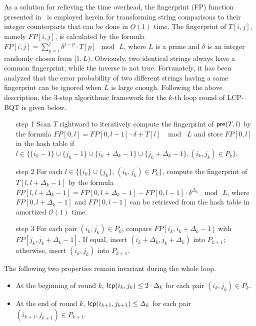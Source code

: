 \documentclass[10pt,journal,compsoc]{IEEEtran}
\begin{document}
\begin{CJK*}{GBK}{song}
As a solution for relieving the time overhead, the fingerprint (FP) function presented in~\cite{Karp1987} is employed herein for transforming string comparisons to their integer counterparts that can be done in $O(1)$ time. The fingerprint of $T[i,j]$, namely $FP[i,j]$, is calculated by the formula $FP[i,j] = \sum_{p=i}^{j} \delta^{j-p} \cdot T[p] \mod \, L$, where $L$ is a prime and $\delta$ is an integer randomly chosen from $[1,L)$. Obviously, two identical strings always have a common fingerprint, while the inverse is not true. Fortunately, it has been analyzed that the error probability of two different strings having a same fingerprint can be ignored when $L$ is large enough. Following the above description, the 3-step algorithmic framework for the $k$-th loop round of LCP-BQT is given below.

\begin{enumerate}
\item[step 1] Scan $T$ rightward to iteratively compute the fingerprint of ${\sf pre}(T,l)$ by the formula $FP[0,l] = FP[0,l-1] \cdot \delta + T[l] \,\, \mod \,\, L$ and store $FP[0,l]$ in the hash table if $l\in \{ \{i_k-1\}\cup\{j_k-1\}\cup\{i_k +\Delta_{k} - 1\}\cup\{j_k+ \Delta_{k} - 1\},(i_k,j_k)\in P_k\}$.
\item[step 2] For each $l\in \{\{i_k\}\cup \{j_k\}$, $(i_k,j_k)\in P_k\}$, compute the fingerprint of $T[l,l+\Delta_{k} - 1]$ by the formula $FP[l,l+ \Delta_{k} - 1]=FP[0,l+ \Delta_{k} - 1] - FP[0,l-1] \cdot \delta^{\Delta_{k}} \, \mod \, L$, where $FP[0,l+ \Delta_{k} - 1]$ and $FP[0,l-1]$ can be retrieved from the hash table in amortized $\mathcal{O}(1)$ time.
\item[step 3] For each pair $(i_k,j_k)\in P_k$, compare $FP[i_k,i_k+\Delta_{k} - 1]$ with $FP[j_k,j_k+\Delta_{k} - 1]$. If equal, insert $(i_k+\Delta_{k},j_k+\Delta_{k})$ into $P_{k+1}$; otherwise, insert $(i_k, j_k)$ into $P_{k+1}$.
\end{enumerate}

The following two properties remain invariant during the whole loop.

\begin{itemize}
\item At the beginning of round $k$, ${\sf lcp}(i_k,j_k) \le 2 \cdot \Delta_{k}$ for each pair $(i_k,j_k) \in P_k$.
\item At the end of round $k$, ${\sf lcp}(i_{k+1},j_{k+1}) \le \Delta_{k}$ for each pair $(i_{k+1},j_{k+1}) \in P_{k+1}$.
\end{itemize}


\end{CJK*}
\end{document}
